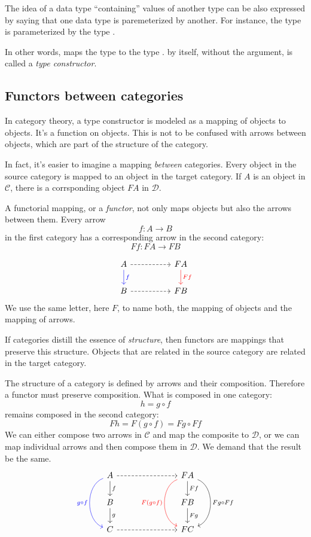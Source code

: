 \documentclass[DaoFP]{subfiles}
\begin{document}
The idea of a data type ``containing'' values of another type can be also expressed by saying that one data type is paremeterized by another. For instance, the type  is parameterized by the type . 

In other words,  maps the type  to the type .  by itself, without the argument, is called a \emph{type constructor}. 

\subsection{Functors between categories}
In category theory, a type constructor is modeled as a mapping of objects to objects. It's a function on objects. This is not to be confused with arrows between objects, which are part of the structure of the category. 

In fact, it's easier to imagine a mapping \emph{between} categories. Every object in the source category is mapped to an object in the target category. If $A$ is an object in $\mathcal{C}$, there is a corrsponding object $F A$ in $\mathcal{D}$.

A functorial mapping, or a \emph{functor}, not only maps objects but also the arrows between them. Every arrow 
\[ f \colon A \to B\]
in the first category has a corresponding arrow in the second category:
\[ F f \colon F A \to F B\]


\[
 \begin{tikzcd}
 A 
 \arrow[d, blue, "f"]
\arrow[rr, dashed]
 && F A
  \arrow[d, red, "F f"]
 \\
 B 
 \arrow[rr, dashed]
&& F B
  \end{tikzcd}
\]
We use the same letter, here $F$, to name both, the mapping of objects and the mapping of arrows. 

If categories distill the essence of \emph{structure}, then functors are mappings that preserve this structure. Objects that are related in the source category are related in the target category. 

The structure of a category is defined by arrows and their composition. Therefore a functor must preserve composition. What is composed in one category:
\[ h = g \circ f \]
remains composed in the second category:
\[ F h = F (g \circ f) = F g \circ F f \]
We can either compose two arrows in $\mathcal{C}$ and map the composite to $\mathcal{D}$, or we can map individual arrows and then compose them in $\mathcal{D}$. We demand that the result be the same.
\[
 \begin{tikzcd}
 A 
 \arrow[d, "f"]
\arrow[rrr, dashed]
\arrow[dd, bend right = 70, blue, "g \circ f"']
 &&& F A
  \arrow[d, "F f"]
  \arrow[dd, bend left = 70, "F g \circ F f"]
  \arrow[dd, bend right = 70, red, "F (g \circ f)"']
 \\
 B 
 \arrow[d, "g"]
&&& F B
 \arrow[d, "F g"]
 \\
 C
 \arrow[rrr, dashed]
&&& F C
  \end{tikzcd}
\]
\end{document}
